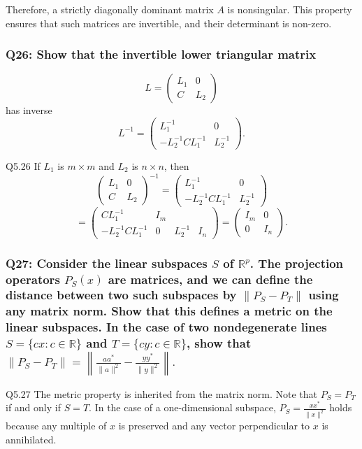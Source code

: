\documentclass[8pt]{article}
\begin{document}
Therefore, a strictly diagonally dominant matrix \(A\) is nonsingular. This property ensures that such matrices are invertible, and their determinant is non-zero.

\subsubsection*{Q26: Show that the invertible lower triangular matrix}
\[
L = \begin{pmatrix}
L_1 & 0 \\
C & L_2
\end{pmatrix}
\]
has inverse
\[
L^{-1} = \begin{pmatrix}
L_1^{-1} & 0 \\
-L_2^{-1} C L_1^{-1} & L_2^{-1}
\end{pmatrix}.
\]

Q5.26 If \( L_1 \) is \( m \times m \) and \( L_2 \) is \( n \times n \), then
\[
\begin{pmatrix}
L_1 & 0 \\
C & L_2
\end{pmatrix}^{-1} = \begin{pmatrix}
L_1^{-1} & 0 \\
-L_2^{-1}CL_1^{-1} & L_2^{-1}
\end{pmatrix}
\]
\[
= \begin{pmatrix}
CL_1^{-1} & I_m \\
-L_2^{-1}CL_1^{-1} & 0 & L_2^{-1} & I_n
\end{pmatrix} 
= \begin{pmatrix}
I_m & 0 \\
0 & I_n
\end{pmatrix}.
\]

\subsubsection*{Q27: Consider the linear subspaces \( S \) of \( \mathbb{R}^p \). The projection operators \( P_S(x) \) are matrices, and we can define the distance between two such subspaces by \( \| P_S - P_T \| \) using any matrix norm. Show that this defines a metric on the linear subspaces. In the case of two nondegenerate lines \( S = \{ cx : c \in \mathbb{R} \} \) and \( T = \{ cy : c \in \mathbb{R} \} \), show that \( \| P_S - P_T \| = \left\| \frac{aa^*}{\| a \|^2} - \frac{yy^*}{\| y \|^2} \right\|. \)}

Q5.27 The metric property is inherited from the matrix norm. Note that \( P_S = P_T \) if and only if \( S = T \). In the case of a one-dimensional subspace, \( P_S = \frac{xx^*}{\|x\|^2} \) holds because any multiple of \( x \) is preserved and any vector perpendicular to \( x \) is annihilated.
\end{document}
